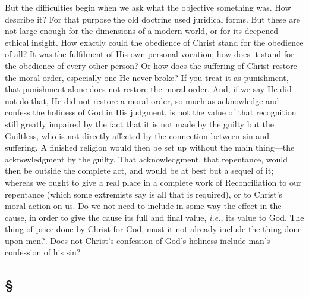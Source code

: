 \documentclass[draft]{ptfdoc}
\begin{document}
But the difficulties begin when we ask what 
the objective something was. How describe it? 
For that purpose the old doctrine used juridical 
forms. But these are not large enough for 
the dimensions of a modern world, or for its 
deepened ethical insight. How exactly could the 
obedience of Christ stand for the obedience of 
all? It was the fulfilment of His own personal 
vocation; how does it stand for the obedience 
of every other person? Or how does the suffering 
of Christ restore the moral order, especially 
one He never broke? If you treat it as punishment, 
that punishment alone does not restore 
the moral order. And, if we say He did not do 
that, He did not restore a moral order, so much 
as acknowledge and confess the holiness of God 
in His judgment, is not the value of that recognition 
still greatly impaired by the fact that it 
is not made by the guilty but the Guiltless, who 
is not directly affected by the connection between 
sin and suffering. A finished religion 
would then be set up without the main thing---the 
acknowledgment by the guilty. That acknowledgment, 
that repentance, would then be 
outside the complete act, and would be at best 
but a sequel of it; whereas we ought to give 
a real place in a complete work of Reconciliation 
to our repentance (which some extremists say is 
all that is required), or to Christ's moral action 
on us. Do we not need to include in some way 
the effect in the cause, in order to give the cause 
its full and final value, \textit{i.e.}, its value to God. 
The thing of price done by Christ for God, must 
it not already include the thing done upon men?. 
Does not Christ's confession of God's holiness 
include man's confession of his sin? 

\subsection*{
\S
}
\end{document}
